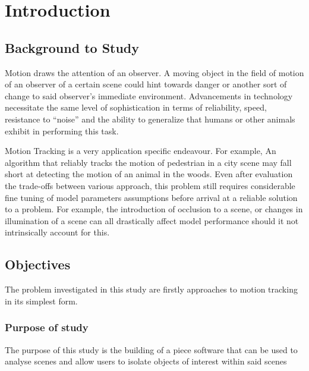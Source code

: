 \chapter{Introduction}

\section{Background to Study}
Motion draws the attention of an observer. A moving object in the field of
motion of an observer of a certain scene could hint towards danger or another
sort of change to said observer's immediate environment. Advancements in
technology necessitate the same level of sophistication in terms of
reliability, speed, resistance to ``noise'' and the ability to generalize that
humans or other animals exhibit in performing this task.

Motion Tracking is a very application specific endeavour. For example, An
algorithm that
reliably tracks the motion of pedestrian in a city scene may fall short at
detecting the motion of an animal in the woods. Even after evaluation the
trade-offs between various approach, this problem still requires considerable fine
tuning of model parameters assumptions before arrival at a reliable solution
to a problem.  For example, the introduction of occlusion to a scene, or changes
in illumination of a scene can all drastically affect model performance should
it not intrinsically account for this.

\section{Objectives}\label{introduction_objectives}
The problem investigated in this study are firstly approaches to motion tracking
in its simplest form.

\subsection{Purpose of study}
The purpose of this study is the building of a piece software that can be used
to analyse scenes and allow users to isolate objects of interest within said
scenes

